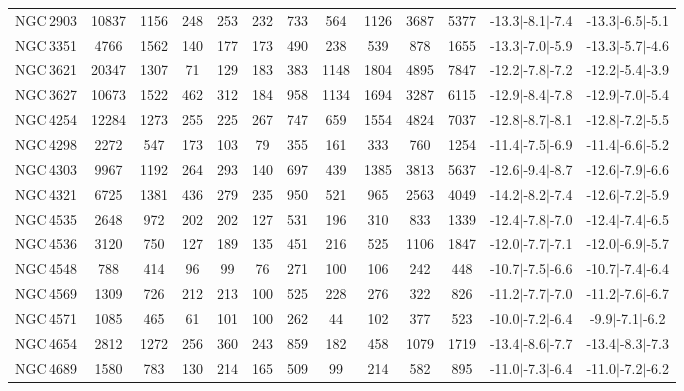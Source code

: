\begin{table*}
\begin{center}
\begin{tabular}{lcccccccccccc}
NGC\,2903 & 10837 & 1156 & 248 & 253 & 232 & 733 & 564 & 1126 & 3687 & 5377 & -13.3$\vert$-8.1$\vert$-7.4 & -13.3$\vert$-6.5$\vert$-5.1 \\ 
NGC\,3351 & 4766 & 1562 & 140 & 177 & 173 & 490 & 238 & 539 & 878 & 1655 & -13.3$\vert$-7.0$\vert$-5.9 & -13.3$\vert$-5.7$\vert$-4.6 \\ 
NGC\,3621 & 20347 & 1307 & 71 & 129 & 183 & 383 & 1148 & 1804 & 4895 & 7847 & -12.2$\vert$-7.8$\vert$-7.2 & -12.2$\vert$-5.4$\vert$-3.9 \\ 
NGC\,3627 & 10673 & 1522 & 462 & 312 & 184 & 958 & 1134 & 1694 & 3287 & 6115 & -12.9$\vert$-8.4$\vert$-7.8 & -12.9$\vert$-7.0$\vert$-5.4 \\ 
NGC\,4254 & 12284 & 1273 & 255 & 225 & 267 & 747 & 659 & 1554 & 4824 & 7037 & -12.8$\vert$-8.7$\vert$-8.1 & -12.8$\vert$-7.2$\vert$-5.5 \\ 
NGC\,4298 & 2272 & 547 & 173 & 103 & 79 & 355 & 161 & 333 & 760 & 1254 & -11.4$\vert$-7.5$\vert$-6.9 & -11.4$\vert$-6.6$\vert$-5.2 \\ 
NGC\,4303 & 9967 & 1192 & 264 & 293 & 140 & 697 & 439 & 1385 & 3813 & 5637 & -12.6$\vert$-9.4$\vert$-8.7 & -12.6$\vert$-7.9$\vert$-6.6 \\ 
NGC\,4321 & 6725 & 1381 & 436 & 279 & 235 & 950 & 521 & 965 & 2563 & 4049 & -14.2$\vert$-8.2$\vert$-7.4 & -12.6$\vert$-7.2$\vert$-5.9 \\ 
NGC\,4535 & 2648 & 972 & 202 & 202 & 127 & 531 & 196 & 310 & 833 & 1339 & -12.4$\vert$-7.8$\vert$-7.0 & -12.4$\vert$-7.4$\vert$-6.5 \\ 
NGC\,4536 & 3120 & 750 & 127 & 189 & 135 & 451 & 216 & 525 & 1106 & 1847 & -12.0$\vert$-7.7$\vert$-7.1 & -12.0$\vert$-6.9$\vert$-5.7 \\ 
NGC\,4548 & 788 & 414 & 96 & 99 & 76 & 271 & 100 & 106 & 242 & 448 & -10.7$\vert$-7.5$\vert$-6.6 & -10.7$\vert$-7.4$\vert$-6.4 \\ 
NGC\,4569 & 1309 & 726 & 212 & 213 & 100 & 525 & 228 & 276 & 322 & 826 & -11.2$\vert$-7.7$\vert$-7.0 & -11.2$\vert$-7.6$\vert$-6.7 \\ 
NGC\,4571 & 1085 & 465 & 61 & 101 & 100 & 262 & 44 & 102 & 377 & 523 & -10.0$\vert$-7.2$\vert$-6.4 & -9.9$\vert$-7.1$\vert$-6.2 \\ 
NGC\,4654 & 2812 & 1272 & 256 & 360 & 243 & 859 & 182 & 458 & 1079 & 1719 & -13.4$\vert$-8.6$\vert$-7.7 & -13.4$\vert$-8.3$\vert$-7.3 \\ 
NGC\,4689 & 1580 & 783 & 130 & 214 & 165 & 509 & 99 & 214 & 582 & 895 & -11.0$\vert$-7.3$\vert$-6.4 & -11.0$\vert$-7.2$\vert$-6.2 \\ 

\end{tabular}
\end{center}
\end{table*}
